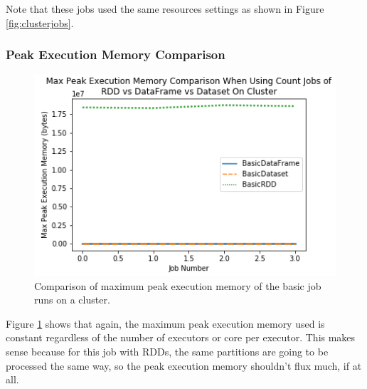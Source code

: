 \documentclass[conference]{IEEEtran}
\begin{document}
Note that these jobs used the same resources settings as shown in Figure \ref{fig:clusterjobs}.

\subsubsection{Peak Execution Memory Comparison}
\begin{figure}
    \includegraphics[width=\linewidth]{../python_scripts/images/basicJobsMaxPeakExecutionMemoryCluster.png}
    \caption{Comparison of maximum peak execution memory of the basic job runs on a cluster.}
    \label{fig:basicJobsMaxPeakExecutionMemoryCluster}
\end{figure}

Figure \ref{fig:basicJobsMaxPeakExecutionMemoryCluster} shows that again, the maximum peak execution memory used is constant regardless of the number of executors or core per executor.
This makes sense because for this job with RDDs, the same partitions are going to be processed the same way, so the peak execution memory shouldn't flux much, if at all.
\end{document}
